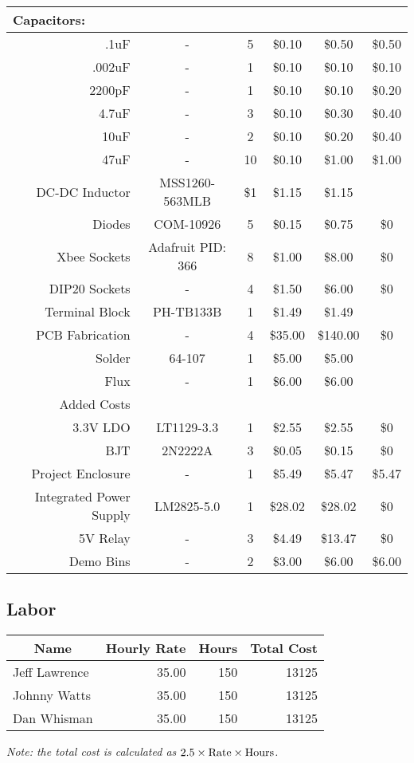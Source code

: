 \begin{center}
\begin{tabular}{|r|c|c|c|c|c|}
\hline
\multicolumn{1}{|l|}{Capacitors:} &   &   &   &  &\\
\hline
{.1uF} & - & 5 & \$0.10 & \$0.50 & \$0.50\\
\hline
{.002uF} & - & 1 & \$0.10 & \$0.10 & \$0.10\\
\hline
{2200pF} & - & 1 & \$0.10 & \$0.10 & \$0.20\\
\hline
{4.7uF} & - & 3 & \$0.10 & \$0.30 & \$0.40\\
\hline
{10uF} & - & 2 & \$0.10 & \$0.20 & \$0.40\\
\hline
{47uF} & - & 10 & \$0.10 & \$1.00 & \$1.00\\
\hline
DC-DC Inductor & MSS1260-563MLB & \$1 & \$1.15 & \$1.15 &\\
\hline
{Diodes} & COM-10926 & 5 & \$0.15 & \$0.75 & \$0\\
\hline
{Xbee Sockets} & Adafruit PID: 366 & 8 & \$1.00 & \$8.00 & \$0\\
\hline
{DIP20 Sockets} & - & 4 & \$1.50 & \$6.00 & \$0\\
\hline
{Terminal Block} & PH-TB133B & 1 & \$1.49 & \$1.49 &\\
\hline
{PCB Fabrication} & - & 4 & \$35.00 & \$140.00 & \$0\\
\hline
{Solder} & 64-107 & 1 & \$5.00 & \$5.00 &\\
\hline
{Flux} & - & 1 & \$6.00 & \$6.00 &\\
\hline
{Added Costs} &  &  &  &  &\\
\hline
\hline
{3.3V LDO} & LT1129-3.3 & 1 & \$2.55 & \$2.55 & \$0\\
\hline
{BJT} & 2N2222A & 3 & \$0.05 & \$0.15 & \$0\\
\hline
{Project Enclosure} & - & 1 & \$5.49 & \$5.47 & \$5.47\\
\hline
{Integrated Power Supply} & LM2825-5.0 & 1 & \$28.02 & \$28.02 & \$0\\
\hline
{5V Relay} & - & 3 & \$4.49 & \$13.47 & \$0\\
\hline
Demo Bins & - & 2 & \$3.00 & \$6.00 & \$6.00\\
\end{tabular}%
\end{center}



\subsection{Labor}
\begin{center}
\begin{tabular}{|l|r|r||r|}
\hline
\multicolumn{1}{|c}{Name} & \multicolumn{1}{|c}{Hourly Rate} & \multicolumn{1}{|c||}{Hours} & \multicolumn{1}{c|}{Total Cost}\\
\hline\hline
Jeff Lawrence & 35.00 & 150 & 13125 \\
\hline
Johnny Watts  & 35.00 & 150 & 13125 \\
\hline
Dan Whisman   & 35.00 & 150 & 13125 \\
\hline
\end{tabular}

{\it Note: the total cost is calculated as $2.5\times {\rm Rate} \times {\rm Hours}$.}
\end{center}

